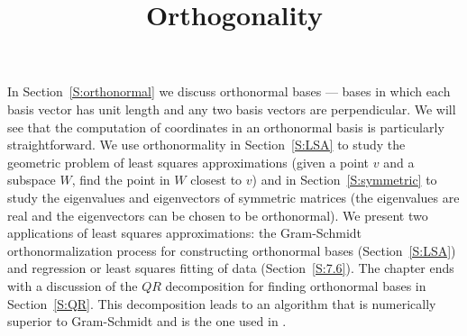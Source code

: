 \documentclass{ximera}
\title{Orthogonality}
\begin{document}
\begin{abstract}
\end{abstract}
\maketitle

\normalsize


In Section~\ref{S:orthonormal} we discuss orthonormal bases --- bases in
which each basis vector has unit length and any two basis vectors are 
perpendicular.
We will see that the computation of coordinates in an orthonormal basis is
particularly straightforward.  We
use orthonormality in Section~\ref{S:LSA} to study the geometric problem of
least squares approximations (given a point $v$ and a subspace $W$, find
the point in $W$ closest to $v$) and in Section~\ref{S:symmetric} to study
the eigenvalues and eigenvectors of symmetric matrices (the eigenvalues are
real and the eigenvectors can be chosen to be orthonormal).  We present two
applications of least squares approximations:  the  Gram-Schmidt
orthonormalization process for constructing orthonormal bases
(Section~\ref{S:LSA}) and regression or least squares fitting of data
(Section~\ref{S:7.6}).   The chapter ends with a discussion of the $QR$
decomposition for finding orthonormal bases in Section~\ref{S:QR}.  This
decomposition leads to an algorithm that is numerically superior to
Gram-Schmidt and is the one used in \Matlabp.
\end{document}
